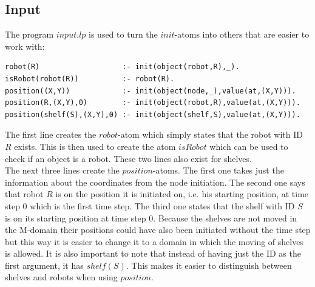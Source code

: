 \documentclass[runningheads]{llncs}
\begin{document}
\subsection{Input}
The program $input.lp$ is used to turn the $init$-atoms into others that are easier to work with:
\begin{verbatim}
robot(R)                   :- init(object(robot,R),_).
isRobot(robot(R))          :- robot(R).
position((X,Y))            :- init(object(node,_),value(at,(X,Y))).
position(R,(X,Y),0)        :- init(object(robot,R),value(at,(X,Y))).
position(shelf(S),(X,Y),0) :- init(object(shelf,S),value(at,(X,Y))).
\end{verbatim}
The first line creates the $robot$-atom which simply states that the robot with ID $R$ exists. This is then used to create the atom $isRobot$ which can be used to check if an object is a robot. These two lines also exist for shelves. \\
The next three lines create the $position$-atoms. The first one takes just the information about the coordinates from the node initiation. The second one says that robot $R$ is on the position it is initiated on, i.e. his starting position, at time step 0 which is the first time step. The third one states that the shelf with ID $S$ is on its starting position at time step 0. Because the shelves are not moved in the M-domain their positions could have also been initiated without the time step but this way it is easier to change it to a domain in which the moving of shelves is allowed. It is also important to note that instead of having just the ID as the first argument, it has $shelf(S)$. This makes it easier to distinguish between shelves and robots when using $position$.
\end{document}
